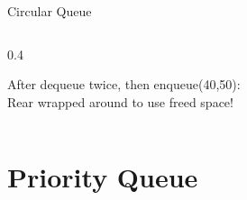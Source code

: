 \documentclass[aspectratio=169,xcolor=dvipsnames]{beamer}
\begin{document}
\begin{frame}{Circular Queue}
\begin{columns}
\begin{column}{0.4\textwidth}

      \vspace{0.2cm}

      After dequeue twice, then enqueue(40,50): \\
      Rear wrapped around to use freed space!
    \end{column}
  \end{columns}
\end{frame}

\section{Priority Queue}
\end{document}
